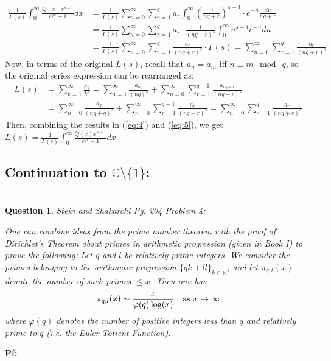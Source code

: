 \documentclass{article}
\newtheorem{question}{Question}
\begin{document}
\begin{equation}
    \label{eq:4}
    \begin{split}
        \frac{1}{\Gamma(s)}\int_{0}^{\infty}\frac{Q(x)x^{s-1}}{e^{qx}-1}dx &= \frac{1}{\Gamma(s)}\sum_{n=0}^{\infty}\sum_{r=1}^{q}a_r\int_{0}^{\infty}\left(\frac{u}{nq+r}\right)^{s-1}\cdot e^{-u}\frac{du}{nq+r}\\
        &= \frac{1}{\Gamma(s)}\sum_{n=0}^{\infty}\sum_{r=1}^{q}a_r\cdot\frac{1}{(nq+r)^s}\int_{0}^{\infty}u^{s-1}e^{-u}du\\
        &= \frac{1}{\Gamma(s)}\sum_{n=0}^{\infty}\sum_{r=1}^{q}\frac{a_{r}}{(nq+r)^s}\cdot\Gamma(s) = \sum_{n=0}^{\infty}\sum_{r=1}^{q}\frac{a_{r}}{(nq+r)^s}
    \end{split}
\end{equation}
Now, in terms of the original $L(s)$, recall that $a_n=a_m$ iff $n\equiv m\mod\ q$, so the original series expression can be rearranged as:
\begin{equation}
    \label{eq:5}
    \begin{split}
        L(s)&=\sum_{k=1}^{\infty}\frac{a_k}{k^s} = \sum_{n=1}^{\infty}\frac{a_{nq}}{(nq)^s}+\sum_{n=0}^{\infty}\sum_{r=1}^{q-1}\frac{a_{nq+r}}{(nq+r)^s}\\
        &=\sum_{n=0}^{\infty}\frac{a_{q}}{(nq+q)^s}+\sum_{n=0}^{\infty}\sum_{r=1}^{q-1}\frac{a_{r}}{(nq+r)^s} = \sum_{n=0}^{\infty}\sum_{r=1}^{q}\frac{a_r}{(nq+r)^s}
    \end{split}
\end{equation}
Then, combining the results in (\ref{eq:4}) and (\ref{eq:5}), we get $L(s)=\frac{1}{\Gamma(s)}\int_{0}^{\infty}\frac{Q(x)x^{s-1}}{e^{qx}-1}dx$.

\subsection{Continuation to $\mathbb{C}\setminus\{1\}$:}

\break

\section{}
\begin{question}\label{q:2}
    Stein and Shakarchi Pg. 204 Problem 4:

    One can combine ideas from the prime number theorem with the proof of Dirichlet's Theorem about primes in arithmetic progression (given in Book I) to prove the following: Let $q$ and $l$ be relatively prime integers. We consider the primes belonging to the arithmetic progression $\{qk+ll\}_{k\in\mathbb{N}}$, and let $\pi_{q,l}(x)$ denote the number of such primes $\leq x$. Then one has 
    $$\pi_{q,l}(x)\sim \frac{x}{\varphi(q)\log(x)}\quad \textmd{as }x\rightarrow\infty$$
    where $\varphi(q)$ denotes the number of positive integers less than $q$ and relatively prime to $q$ (i.e. the Euler Totient Function).
\end{question}

\textbf{Pf:}
\end{document}
